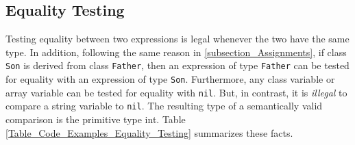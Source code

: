 \documentclass{article}
\begin{document}
\newpage
\subsection{Equality Testing}
\label{subsection_Equality_Testing}
Testing equality between two expressions is legal whenever the two have the same type.
In addition, following the same reason in \ref{subsection_Assignments},
if class \verb"Son" is derived from class \verb"Father",
then an expression  of type \verb"Father" can be
tested for equality with an expression of type \verb"Son".
Furthermore, any class variable or array variable can be tested for equality with \verb"nil".
But, in contrast, it is \textit{illegal} to compare a string variable to \verb"nil".
The resulting type of a semantically valid comparison is the primitive type int.
Table \ref{Table_Code_Examples_Equality_Testing} summarizes these facts.
\end{document}
